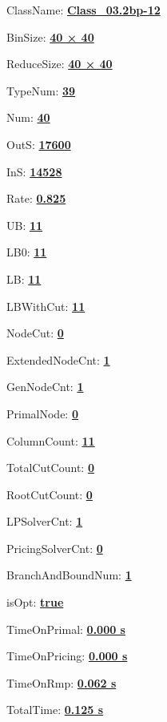 \documentclass[11pt]{article}
\begin{document}
\pagestyle{empty}


ClassName: \underline{\textbf{Class_03.2bp-12}}
\par
BinSize: \underline{\textbf{40 × 40}}
\par
ReduceSize: \underline{\textbf{40 × 40}}
\par
TypeNum: \underline{\textbf{39}}
\par
Num: \underline{\textbf{40}}
\par
OutS: \underline{\textbf{17600}}
\par
InS: \underline{\textbf{14528}}
\par
Rate: \underline{\textbf{0.825}}
\par
UB: \underline{\textbf{11}}
\par
LB0: \underline{\textbf{11}}
\par
LB: \underline{\textbf{11}}
\par
LBWithCut: \underline{\textbf{11}}
\par
NodeCut: \underline{\textbf{0}}
\par
ExtendedNodeCnt: \underline{\textbf{1}}
\par
GenNodeCnt: \underline{\textbf{1}}
\par
PrimalNode: \underline{\textbf{0}}
\par
ColumnCount: \underline{\textbf{11}}
\par
TotalCutCount: \underline{\textbf{0}}
\par
RootCutCount: \underline{\textbf{0}}
\par
LPSolverCnt: \underline{\textbf{1}}
\par
PricingSolverCnt: \underline{\textbf{0}}
\par
BranchAndBoundNum: \underline{\textbf{1}}
\par
isOpt: \underline{\textbf{true}}
\par
TimeOnPrimal: \underline{\textbf{0.000 s}}
\par
TimeOnPricing: \underline{\textbf{0.000 s}}
\par
TimeOnRmp: \underline{\textbf{0.062 s}}
\par
TotalTime: \underline{\textbf{0.125 s}}
\par
\newpage


\end{document}
